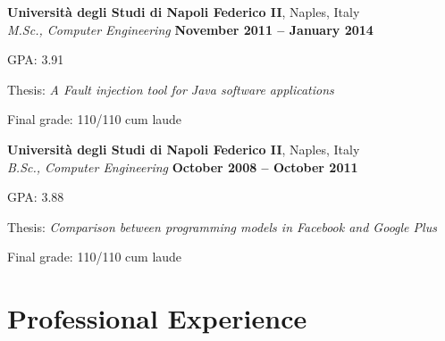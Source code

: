\documentclass[margin,line]{resume}
\begin{document}
\begin{resume}
\textbf{Universit\`a degli Studi di Napoli Federico II}, Naples, Italy \vspace{1mm}\\%
\textsl{M.Sc., Computer Engineering} \hfill \textbf{November 2011 -- January 2014}\vspace{-3mm}\\\vspace{-1mm}%
\begin{list2}
	\item GPA: 3.91
	\item Thesis: \textsl{A Fault injection tool for Java software applications}
	\item Final grade: 110/110 cum laude
\end{list2}\vspace{-1.5mm}    


\textbf{Universit\`a degli Studi di Napoli Federico II}, Naples, Italy \vspace{1mm}\\%
\textsl{B.Sc., Computer Engineering} \hfill \textbf{October 2008 -- October 2011}\vspace{-3mm}\\\vspace{-1mm}%
\begin{list2}
	\item GPA: 3.88
	\item Thesis: \textsl{Comparison between programming models in Facebook and Google Plus}
        \item Final grade: 110/110 cum laude
\end{list2}\vspace{-1.5mm}    





\section{\mysidestyle Professional Experience}


\end{resume}
\end{document}
